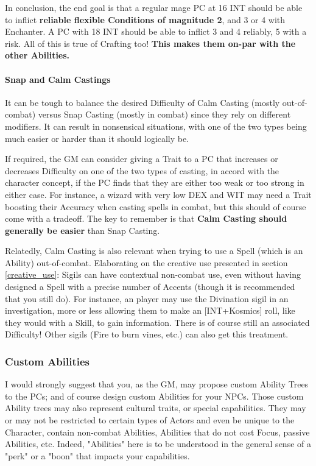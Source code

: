 In conclusion, the end goal is that a regular mage PC at 16 INT should be able to inflict \textbf{reliable flexible Conditions of magnitude 2}, and 3 or 4 with Enchanter. A PC with 18 INT should be able to inflict 3 and 4 reliably, 5 with a risk. All of this is true of Crafting too! \textbf{This makes them on-par with the other Abilities.}


\paragraph{Snap and Calm Castings}

It can be tough to balance the desired Difficulty of Calm Casting (mostly out-of-combat) versus Snap Casting (mostly in combat) since they rely on different modifiers. It can result in nonsensical situations, with one of the two types being much easier or harder than it should logically be.

If required, the GM can consider giving a Trait to a PC that increases or decreases Difficulty on one of the two types of casting, in accord with the character concept, if the PC finds that they are either too weak or too strong in either case. For instance, a wizard with very low DEX and WIT may need a Trait boosting their Accuracy when casting spells in combat, but this should of course come with a tradeoff. The key to remember is that \textbf{Calm Casting should generally be easier} than Snap Casting.

Relatedly, Calm Casting is also relevant when trying to use a Spell (which is an Ability) out-of-combat. Elaborating on the creative use presented in section \ref{creative_use}: Sigils can have contextual non-combat use, even without having designed a Spell with a precise number of Accents (though it is recommended that you still do). For instance, an player may use the Divination sigil in an investigation, more or less allowing them to make an [INT+Kosmics] roll, like they would with a Skill, to gain information. There is of course still an associated Difficulty! Other sigils (Fire to burn vines, etc.) can also get this treatment.


\subsubsection{Custom Abilities}

\label{balancing_abilities}

I would strongly suggest that you, as the GM, may propose custom Ability Trees to the PCs; and of course design custom Abilities for your NPCs. Those custom Ability trees may also represent cultural traits, or special capabilities. They may or may not be restricted to certain types of Actors and even be unique to the Character, contain non-combat Abilities, Abilities that do not cost Focus, passive Abilities, etc. Indeed, "Abilities" here is to be understood in the general sense of a "perk" or a "boon" that impacts your capabilities.

